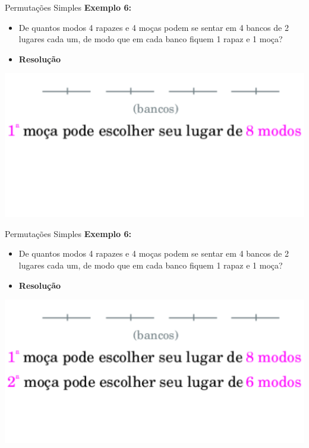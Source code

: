 \documentclass[aspectratio=169]{beamer}
\begin{document}
\begin{frame}{Permutações Simples}
    \textbf{Exemplo 6:}

    \vspace{2mm}

    \begin{itemize}
        \item[] De quantos modos 4 rapazes e 4 moças podem se sentar em 4 bancos de 2 lugares cada um, de modo que em cada banco fiquem 1 rapaz e 1 moça? 
        \item[] \textbf{Resolução}
    \end{itemize}

    \begin{center}
        \includegraphics[width=0.65\linewidth]{figs/Exemplo6_2.png}
    \end{center}
\end{frame}

\begin{frame}{Permutações Simples}
    \textbf{Exemplo 6:}

    \vspace{2mm}

    \begin{itemize}
        \item[] De quantos modos 4 rapazes e 4 moças podem se sentar em 4 bancos de 2 lugares cada um, de modo que em cada banco fiquem 1 rapaz e 1 moça? 
        \item[] \textbf{Resolução}
    \end{itemize}

    \begin{center}
        \includegraphics[width=0.65\linewidth]{figs/Exemplo6_3.png}
    \end{center}
\end{frame}
\end{document}
